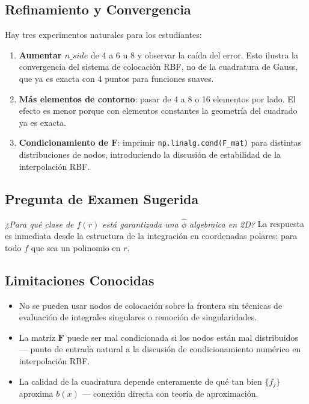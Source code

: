 \documentclass[12pt,a4paper]{article}
\begin{document}
\subsection{Refinamiento y Convergencia}

Hay tres experimentos naturales para los estudiantes:

\begin{enumerate}
    \item \textbf{Aumentar $n\_side$} de 4 a 6 u 8 y observar la caída del
    error. Esto ilustra la convergencia del sistema de colocación RBF, no de
    la cuadratura de Gauss, que ya es exacta con 4 puntos para funciones
    suaves.
    \item \textbf{Más elementos de contorno}: pasar de 4 a 8 o 16 elementos
    por lado. El efecto es menor porque con elementos constantes la geometría
    del cuadrado ya es exacta.
    \item \textbf{Condicionamiento de $\mathbf{F}$}: imprimir
    \texttt{np.linalg.cond(F\_mat)} para distintas distribuciones de nodos,
    introduciendo la discusión de estabilidad de la interpolación RBF.
\end{enumerate}

\subsection{Pregunta de Examen Sugerida}

\textit{¿Para qué clase de $f(r)$ está garantizada una $\hat{\phi}$ algebraica
en 2D?} La respuesta es inmediata desde la estructura de la integración en
coordenadas polares: para todo $f$ que sea un polinomio en $r$.

\subsection{Limitaciones Conocidas}

\begin{itemize}
    \item No se pueden usar nodos de colocación sobre la frontera sin
    técnicas de evaluación de integrales singulares o remoción de
    singularidades.
    \item La matriz $\mathbf{F}$ puede ser mal condicionada si los nodos
    están mal distribuidos — punto de entrada natural a la discusión de
    condicionamiento numérico en interpolación RBF.
    \item La calidad de la cuadratura depende enteramente de qué tan bien
    $\{f_j\}$ aproxima $b(x)$ — conexión directa con teoría de aproximación.
\end{itemize}
\end{document}
